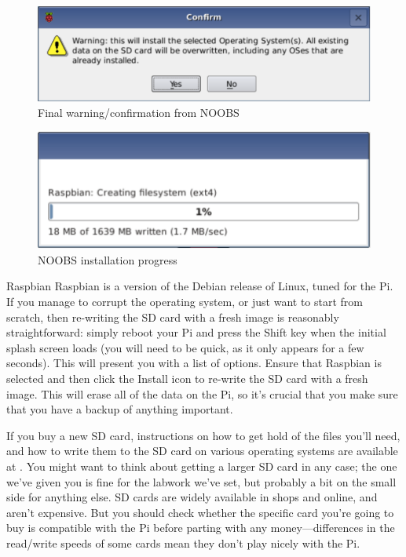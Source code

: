 \begin{figure}
\centerline{\includegraphics[width=13cm]{images/noobs-install-warning}}
\caption{Final warning/confirmation from NOOBS}\label{figure:noobs-install-warning}
\end{figure}

\begin{figure}
\centerline{\includegraphics{images/noobs-install-progress}}
\caption{NOOBS installation progress}\label{figure:noobs-install-progress}
\end{figure}

\begin{rpi}{Raspbian}
  Raspbian is a version of the Debian release of Linux, tuned for the Pi. If you manage to corrupt the operating system, or just want to start from scratch, then re-writing the SD card with a fresh image is reasonably straightforward: simply reboot your Pi and press the Shift key when the initial splash screen loads (you will need to be quick, as it only appears for a few seconds). This will present you with a list of options. Ensure that Raspbian is selected and then click the Install icon to re-write the SD card with a fresh image. This will erase all of the data on the Pi, so it's crucial that you make sure that you have a backup of anything important.

  If you buy a new SD card, instructions on how to get hold of the files you'll need, and how to write them to the SD card on various operating systems are available at . You might want to think about getting a larger SD card in any case; the one we've given you is fine for the labwork we've set, but probably a bit on the small side for anything else. SD cards are widely available in shops and online, and aren't expensive. But you should check whether the specific card you're going to buy is compatible with the Pi before parting with any money---differences in the read/write speeds of some cards mean they don't play nicely with the Pi.
\end{rpi}


